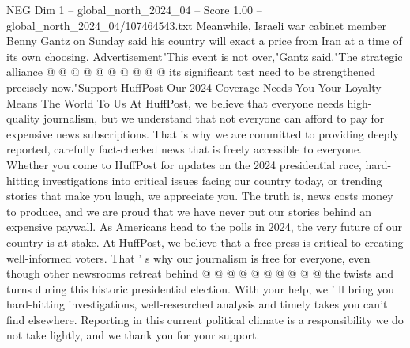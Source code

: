 \begin{textsample}{NEG Dim 1 – global\_north\_2024\_04 – Score 1.00 – global\_north\_2024\_04/107464543.txt}
Meanwhile, Israeli war cabinet member Benny Gantz on Sunday said his country will exact a price from Iran at a time of its own choosing.
Advertisement"This event is not over,"Gantz said."The strategic alliance @ @ @ @ @ @ @ @ @ @ its significant test need to be strengthened precisely now."Support HuffPost Our 2024 Coverage Needs You Your Loyalty Means The World To Us At HuffPost, we believe that everyone needs high-quality journalism, but we understand that not everyone can afford to pay for expensive news subscriptions.
That is why we are committed to providing deeply reported, carefully fact-checked news that is freely accessible to everyone.
Whether you come to HuffPost for updates on the 2024 presidential race, hard-hitting investigations into critical issues facing our country today, or trending stories that make you laugh, we appreciate you.
The truth is, news costs money to produce, and we are proud that we have never put our stories behind an expensive paywall.
As Americans head to the polls in 2024, the very future of our country is at stake.
At HuffPost, we believe that a free press is critical to creating well-informed voters.
That ' s why our journalism is free for everyone, even though other newsrooms retreat behind @ @ @ @ @ @ @ @ @ @ the twists and turns during this historic presidential election.
With your help, we ' ll bring you hard-hitting investigations, well-researched analysis and timely takes you can't find elsewhere.
Reporting in this current political climate is a responsibility we do not take lightly, and we thank you for your support.

\end{textsample}
